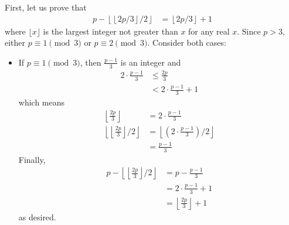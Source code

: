 \documentclass{subfile}
\begin{document}
	\begin{solution}
		First, let us prove that
			\begin{align}\label{eq:primefloor}
				p - \left\lfloor \left\lfloor 2p/3\right\rfloor /2\right\rfloor
					& = \left\lfloor 2p/3\right\rfloor + 1
			\end{align}
		where $\lfloor x \rfloor$ is the largest integer not greater than $x$ for any real $x$. Since $p>3$, either $p \equiv 1 \pmod 3$ or $p \equiv 2 \pmod 3$. Consider both cases:
		\begin{itemize}
			\item If $p \equiv 1 \pmod 3$, then $\frac{p-1}{3}$ is an integer and
				\begin{align*}
					2\cdot\frac {p - 1}{3}
						& \leq\frac {2p}{3}\\
						& < 2\cdot\frac {p - 1}{3} + 1
				\end{align*}
			which means
				\begin{align*}
					\left\lfloor\frac {2p}{3}\right\rfloor &= 2\cdot\frac {p - 1}{3}\\
					\left\lfloor\left\lfloor\frac {2p}{3}\right\rfloor /2\right\rfloor
						&= \left\lfloor\left(2\cdot\frac {p - 1}{3}\right)/2\right\rfloor\\
						& = \frac {p - 1}{3}
				\end{align*}
			Finally,
				\begin{align*}
					p - \left\lfloor\left\lfloor\frac {2p}{3}\right\rfloor /2\right\rfloor
						& = p - \frac {p - 1}{3}\\
						& = 2\cdot\frac {p - 1}{3} + 1\\
						& = \left\lfloor\frac {2p}{3}\right\rfloor + 1
				\end{align*}
			as desired.


\end{itemize}
\end{solution}
\end{document}
